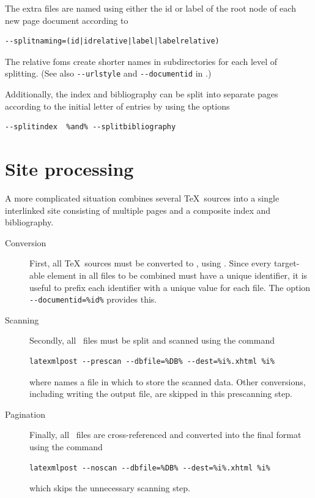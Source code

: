 \documentclass{book}
\newcommand{\shellcode}{\lstinline[style=shell]}
\begin{document}
The extra files are named using either the id or label
of the root node of each new page document according to
\begin{lstlisting}[style=shell]
--splitnaming=(id|idrelative|label|labelrelative)
\end{lstlisting}
The relative foms create shorter names in subdirectories for each
level of splitting.
(See also \shellcode{--urlstyle} and  \shellcode{--documentid} in .)

Additionally, the index and bibliography can be split
into separate pages according to the initial letter of entries by using the options
\begin{lstlisting}[style=shell]
--splitindex  %and% --splitbibliography
\end{lstlisting}

\section[Sites]{Site processing}\label{usage.site}
A more complicated situation combines several \TeX\ sources
into a single interlinked site consisting of multiple pages
and a composite index and bibliography.

\begin{description}
\item[Conversion] First, all \TeX\ sources must be converted
   to \XML, using .  Since every target-able element
   in all files to be combined must have a unique identifier, it is useful to
   prefix each identifier with a unique value for each file. 
   The  option \shellcode{--documentid=%

 \item[Scanning] Secondly, all \XML\ files must be split and scanned using
  the command
  \begin{lstlisting}[style=shell]
   latexmlpost --prescan --dbfile=%DB% --dest=%i%.xhtml %i%
  \end{lstlisting}
  where  names a file in which to store the scanned data.
  Other conversions, including writing the output file, are skipped in this prescanning step.
 
 \item[Pagination] Finally, all \XML\ files are cross-referenced and converted into
   the final format using the command
   \begin{lstlisting}[style=shell]
     latexmlpost --noscan --dbfile=%DB% --dest=%i%.xhtml %i%
   \end{lstlisting}
   which skips the unnecessary scanning step.
\end{description}
\end{document}
